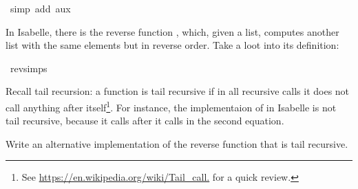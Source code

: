\begin{isabellebody}
\ {\isacharparenleft}{\kern0pt}simp\ add{\isacharcolon}{\kern0pt}\ aux{\isacharparenright}{\kern0pt}%
\endisatagproof
{\isafoldproof}%
%
\isadelimproof
%
\endisadelimproof
%
\begin{isamarkuptext}%
In Isabelle, there is the reverse function , which, given a list, computes another list
with the same elements but in reverse order.
Take a loot into its definition:%
\end{isamarkuptext}\isamarkuptrue%
\isamarkupfalse%
\ rev{\isachardot}{\kern0pt}simps%
\begin{isamarkuptext}%
Recall tail recursion: a function is tail recursive if in all recursive calls it does not call 
  anything after itself\footnote{See \url{https://en.wikipedia.org/wiki/Tail_call.} for a quick review.}.
  For instance, the implementaion of  in Isabelle is not tail recursive, because it calls
  \isa{{\isacharparenleft}{\kern0pt}{\isacharat}{\kern0pt}{\isacharparenright}{\kern0pt}} after it calls  in the second equation.
  
  Write an alternative implementation of the reverse function that is tail recursive.


\end{isamarkuptext}
\end{isabellebody}
